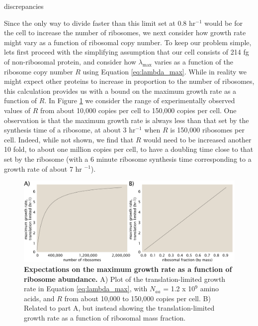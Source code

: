 discrepancies \documentclass[11pt, letterpaper]{article}
\begin{document}
Since the only way to divide faster than this limit set at 0.8 hr$^{-1}$ would be
for the cell to increase the number of ribosomes, we next consider how
growth rate might vary as a function of ribosomal copy number. To
keep our problem simple,  lets first proceed with the simplifying assumption
that our cell consists of  214 fg of non-ribosomal protein, and consider
how $\lambda_{\text{max}}$ varies  as a function of the ribosome copy number $R$
using Equation \ref{eq:lambda_max}.  While in reality we might expect other
proteins to increase in proportion to the number of ribosomes, this calculation
provides us with a bound on the maximum growth rate as a function of $R$.  In
Figure \ref{fig:estimates_translation_toy_1} we consider the range of experimentally observed values
of $R$ from about 10,000 copies per cell to
150,000 copies per cell. One observation is that
the maximum growth rate is always less than that set by the synthesis time of a
ribosome, at about 3 hr$^{-1}$ when $R$ is 150,000 ribosomes per cell. Indeed, while not shown,
we find that $R$ would need to be increased another 10 fold, to
about one million copies per cell, to have a doubling time close to that set by the ribosome (with a 6 minute ribosome synthesis time
corresponding to a growth rate of about 7 hr $^{-1}$).


\begin{figure}[H]
		\centering
    \includegraphics[width=1\textwidth]{../../code/figures/SI/estimates_translation_toy_1.pdf}
  \caption{{\bf Expectations on the maximum growth rate as a function of ribosome abundance.}
	 	A) Plot of the translation-limited growth rate in Equation
	 	\ref{eq:lambda_max}, with $N_{aa}$ = 1.2 x 10$^9$ amino acids, and $R$ from about
	 	10,000 to 150,000 copies per cell. B) Related to part A, but instead
	 	showing the translation-limited growth rate as a function of ribosomal mass
	 	fraction.}
  \label{fig:estimates_translation_toy_1}
\end{figure}
\end{document}
